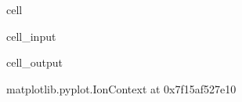 \documentclass[letterpaper,10pt,english]{jupyterBook}
\begin{document}
\begin{sphinxuseclass}{cell}\begin{sphinxVerbatimInput}

\begin{sphinxuseclass}{cell_input}
\begin{sphinxVerbatim}[commandchars=\\\{\}]
    
   
   
\end{sphinxVerbatim}

\end{sphinxuseclass}\end{sphinxVerbatimInput}
\begin{sphinxVerbatimOutput}

\begin{sphinxuseclass}{cell_output}
\begin{sphinxVerbatim}[commandchars=\\\{\}]
\PYGZlt{}matplotlib.pyplot.\PYGZus{}IonContext at 0x7f15af527e10\PYGZgt{}
\end{sphinxVerbatim}

\end{sphinxuseclass}\end{sphinxVerbatimOutput}

\end{sphinxuseclass}
\end{document}
